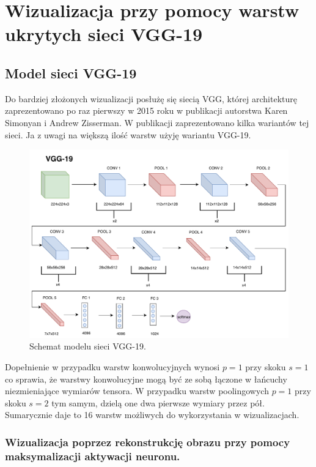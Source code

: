 \chapter{Wizualizacja przy pomocy warstw ukrytych sieci VGG-19}
\label{chap:vgg}
\section{Model sieci VGG-19}
\label{vgg-model}

Do bardziej złożonych wizualizacji posłużę się siecią VGG, której architekturę zaprezentowano po raz pierwszy w 2015 roku w publikacji autorstwa Karen Simonyan i 
Andrew Zisserman\cite{vggpaper}. W publikacji zaprezentowano kilka wariantów tej sieci. Ja z uwagi na większą ilość warstw użyję wariantu VGG-19.

\begin{figure}[ht]
\centerline{\includegraphics[scale=0.5]{resources/vgg/vgg.pdf}}
\caption{Schemat modelu sieci VGG-19.}
\label{fig:vgg19-schemat}
\end{figure}

Dopełnienie w przypadku warstw konwolucyjnych wynosi \(p=1\) przy skoku \(s=1\) co sprawia, że warstwy konwolucyjne mogą być ze sobą łączone w łańcuchy niezmieniające wymiarów tensora. W przypadku warstw poolingowych \(p=1\) przy skoku \(s=2\) tym samym, dzielą one dwa pierwsze wymiary przez pół. Sumarycznie daje to 16 warstw możliwych do wykorzystania w wizualizacjach.

\subsection{Wizualizacja poprzez rekonstrukcję obrazu przy pomocy maksymalizacji aktywacji neuronu.}
\label{vgg-mean-activation}

